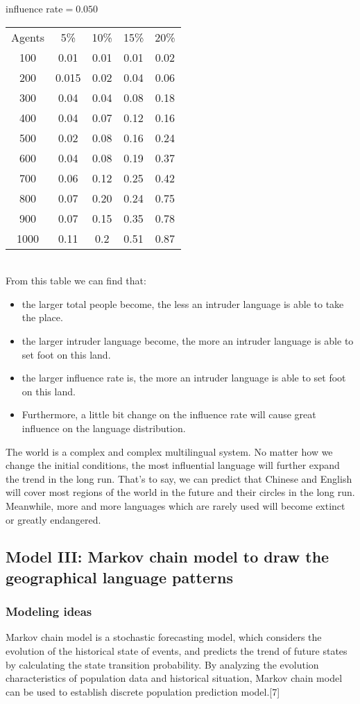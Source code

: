 \documentclass{mcmthesis}
\begin{document}
influence rate$=0.050$ 
\begin{tabular}{c|c|c|c|c}
Agents & 5\% & 10\% & 15\% & 20\% \\
100	& 0.01	& 0.01	& 0.01	& 0.02 \\
200	& 0.015	& 0.02	& 0.04 & 0.06 \\
300	& 0.04	& 0.04	& 0.08 & 0.18 \\
400	& 0.04	& 0.07	& 0.12	& 0.16 \\
500	& 0.02	& 0.08	& 0.16 & 0.24 \\
600	& 0.04	& 0.08 & 0.19 & 0.37 \\
700	& 0.06	& 0.12 & 0.25 & 0.42 \\ 
800	& 0.07 & 0.20 & 0.24 & 0.75 \\
900	& 0.07 & 0.15 & 0.35 & 0.78 \\
1000	& 0.11 & 0.2 & 0.51	 & 0.87
\end{tabular} \\
From this table we can find that:
\begin{itemize}
\item the larger total people become, the less an intruder language is able to take the place.
\item the larger intruder language become, the more an intruder language is able to set foot on this land.
\item the larger influence rate is, the more an intruder language is able to set foot on this land. 
\item Furthermore, a little bit change on the influence rate will cause great influence on the language distribution.
\end{itemize}
\hspace*{8mm}The world is a complex and complex multilingual system. No matter how we change the initial conditions, the most influential language will further expand the trend in the long run. That's to say, we can predict that Chinese and English will cover most regions of the world in the future and their circles in the long run. Meanwhile, more and more languages which are rarely used will become extinct or greatly endangered.\\

\subsection{Model III: Markov chain model to draw the geographical language patterns}
\subsubsection{Modeling ideas}
\hspace*{8mm}Markov chain model is a stochastic forecasting model, which considers the evolution of the historical state of events, and predicts the trend of future states by calculating the state transition probability. By analyzing the evolution characteristics of population data and historical situation, Markov chain model can be used to establish discrete population prediction model.[7]
\end{document}
